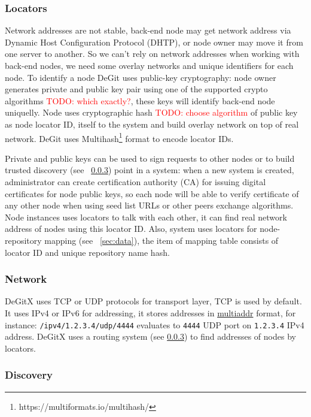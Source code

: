 \documentclass[acmlarge, screen, nonacm]{acmart}
\newcommand{\code}[1]{\texttt{#1}}
\newcommand{\todo}[1]{\textcolor{red}{TODO: #1}}
\begin{document}
\subsubsection{Locators}
\label{sec:locators}
Network addresses are not stable, back-end node may get network address via
Dynamic Host Configuration Protocol (DHTP), or node owner may move it from one server to another.
So we can't rely on network addresses when working with back-end nodes, we need some
overlay networks and unique identifiers for each node. To identify a node DeGit uses
public-key cryptography: node owner generates private and public key pair using one of the supported
crypto algorithms \todo{which exactly?}, these keys will identify back-end node uniquelly.
Node uses cryptographic hash \todo{choose algorithm} of public key as node locator ID,
itself to the system and build overlay network on top of real network. DeGit uses
Multihash\footnote{https://multiformats.io/multihash/} format to encode locator IDs.

Private and public keys can be used to sign requests to other nodes or to build
trusted discovery (see ~\ref{sec:discovery}) point in a system: when a new system is created,
administrator can create certification authority (CA) for issuing digital certificates for node
public keys, so each node will be able to verify certificate of any other node when
using seed list URLs or other peers exchange algorithms. Node instances uses locators to talk
with each other, it can find real network address of nodes using this locator ID.
Also, system uses locators for node-repository mapping (see ~\ref{sec:data}),
the item of mapping table consists of locator ID and unique repository name hash.

\subsubsection{Network}
\label{sec:network}

DeGitX uses TCP or UDP protocols for transport layer, TCP is used by default. It uses IPv4 or IPv6 for addressing,
it stores addresses in \href{https://github.com/multiformats/multiaddr}{multiaddr} format, for instance:
\code{/ipv4/1.2.3.4/udp/4444} evaluates to \code{4444} UDP port on \code{1.2.3.4} IPv4 address.
DeGitX uses a routing system (see \ref{sec:discovery}) to find addresses of nodes by locators.

\subsubsection{Discovery}
\label{sec:discovery}
\end{document}
